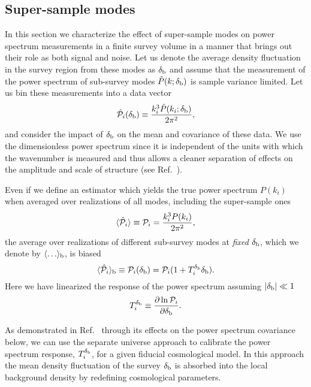 \documentclass[prd,twocolumn,amsmath,amssymb,floatfix,superscriptaddress]{revtex4-1}
\newcommand{\br}{{\rm b}}
\newcommand{\Dv}{{\cal P}}
\begin{document}
 
\subsection{Super-sample modes}
\label{sub:signal}

In this section we characterize the effect of super-sample modes  on power spectrum measurements
in a finite survey volume in a manner that brings out their role as both signal
and noise.  Let us denote the average density fluctuation in the survey region from
these modes as $\delta_\br$ and assume that the measurement of the power spectrum of sub-survey modes  $\hat P(k;\delta_\br)$ is sample variance limited.   Let us bin these measurements into
a data vector 
%
\begin{equation}
\hat \Dv_i(\delta_\br) \equiv \frac{k_i^3 \hat P(k_i; \delta_\br)}{2\pi^2},
\label{eq:Di_def}
\end{equation}
and consider the impact of $\delta_\br$ on the mean and covariance of these data.
% 
We use the dimensionless power spectrum since it is independent of the units
with which the wavenumber is measured and thus allows a cleaner separation
of effects on the amplitude and scale of structure (see Ref.~\cite{Lietal:14}).

Even if we define an estimator which yields the true power spectrum $P(k_i)$
when averaged over realizations of all modes, including the super-sample ones
%
\begin{equation}
\langle \hat \Dv_i \rangle \equiv \Dv_i = \frac{k_i^3  P(k_i)}{2\pi^2},
\label{eq:ave_Di}
\end{equation}
%
the average over realizations of different sub-survey modes 
at {\em fixed} $\delta_\br$, which we denote by
$\langle \ldots \rangle_\br$, is biased
%
\begin{equation}
    \langle \hat \Dv_i \rangle_\br \equiv \Dv_i(\delta_\br) = \Dv_i (1 + T^{\delta_\br}_i \delta_\br).
\label{eq:psest_sub}
\end{equation}
%
Here we have linearized the response of the power spectrum assuming 
$|\delta_\br|\ll 1$
%
\begin{equation}
T^{\delta_\br}_i \equiv \frac{\partial \ln \Dv_i}{\partial \delta_\br}.
\label{eq:global}
\end{equation}
%

As demonstrated in Ref.~\cite{Lietal:14} through its effects
on the power spectrum covariance below, we can use the separate
universe  approach to calibrate the power spectrum response,
$T^{\delta_\br}_i$, for a given fiducial cosmological model. 
{In this approach}
the mean density {fluctuation}
of the survey $\delta_\br$ is absorbed
into {the local background density} by redefining cosmological parameters.
\end{document}
